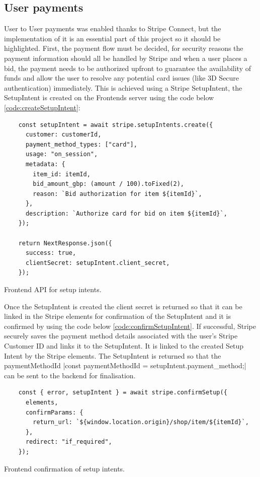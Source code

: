 \documentclass[]{project_report}
\begin{document}
\subsection{User payments}
User to User payments was enabled thanks to Stripe Connect, but the implementation of it is an essential part of this project so it should be highlighted. First, the payment flow must be decided, for security reasons the payment information should all be handled by Stripe and when a user places a bid, the payment needs to be authorized upfront to guarantee the availability of funds and allow the user to resolve any potential card issues (like 3D Secure authentication) immediately. This is achieved using a Stripe SetupIntent, the SetupIntent is created on the Frontends server using the code below \ref{code:createSetupIntent}: 

\begin{codeblock}[H]
    \begin{verbatim}
    const setupIntent = await stripe.setupIntents.create({
      customer: customerId,
      payment_method_types: ["card"],
      usage: "on_session",
      metadata: {
        item_id: itemId,
        bid_amount_gbp: (amount / 100).toFixed(2),
        reason: `Bid authorization for item ${itemId}`,
      },
      description: `Authorize card for bid on item ${itemId}`,
    });

    return NextResponse.json({
      success: true,
      clientSecret: setupIntent.client_secret,
    });
\end{verbatim}
    \caption{Frontend API for setup intents.}
    \label{code:createSetupIntent}
\end{codeblock}

Once the SetupIntent is created the client secret is returned so that it can be linked in the Stripe elements for confirmation of the SetupIntent and it is confirmed by using the code below \ref{code:confirmSetupIntent}. If successful, Stripe securely saves the payment method details associated with the user's Stripe Customer ID and links it to the SetupIntent. It is linked to the created Setup Intent by the Stripe elements. The SetupIntent is returned so that the paymentMethodId |const paymentMethodId = setupIntent.payment_method;| can be sent to the backend for finalisation.

\begin{codeblock}[H]
    \begin{verbatim}
    const { error, setupIntent } = await stripe.confirmSetup({
      elements,
      confirmParams: {
        return_url: `${window.location.origin}/shop/item/${itemId}`,
      },
      redirect: "if_required",
    });
\end{verbatim}
    \caption{Frontend confirmation of setup intents.}
    \label{code:confirmSetupIntent}
\end{codeblock}
\end{document}
